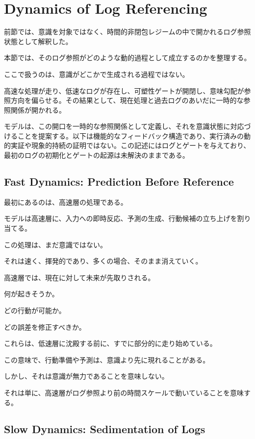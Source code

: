 \section{Dynamics of Log Referencing}


前節では、意識を対象ではなく、時間的非閉包レジームの中で開かれるログ参照状態として解釈した。

本節では、そのログ参照がどのような動的過程として成立するのかを整理する。

ここで扱うのは、意識がどこかで生成される過程ではない。

高速な処理が走り、低速なログが存在し、可塑性ゲートが開閉し、意味勾配が参照方向を偏らせる。その結果として、現在処理と過去ログのあいだに一時的な参照関係が開かれる。

モデルは、この開口を一時的な参照関係として定義し、それを意識状態に対応づけることを提案する。以下は機能的なフィードバック構造であり、実行済みの動的実証や現象的持続の証明ではない。この記述にはログとゲートを与えており、最初のログの初期化とゲートの起源は未解決のままである。

\subsection{Fast Dynamics: Prediction Before Reference}

最初にあるのは、高速層の処理である。

モデルは高速層に、入力への即時反応、予測の生成、行動候補の立ち上げを割り当てる。

この処理は、まだ意識ではない。

それは速く、揮発的であり、多くの場合、そのまま消えていく。

高速層では、現在に対して未来が先取りされる。

何が起きそうか。

どの行動が可能か。

どの誤差を修正すべきか。

これらは、低速層に沈殿する前に、すでに部分的に走り始めている。

この意味で、行動準備や予測は、意識より先に現れることがある。

しかし、それは意識が無力であることを意味しない。

それは単に、高速層がログ参照より前の時間スケールで動いていることを意味する。

\subsection{Slow Dynamics: Sedimentation of Logs}

